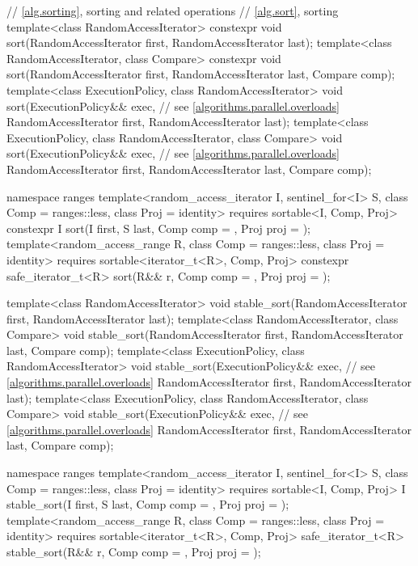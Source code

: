 \begin{codeblock}
{  // \ref{alg.sorting}, sorting and related operations
  // \ref{alg.sort}, sorting
  template<class RandomAccessIterator>
    constexpr void sort(RandomAccessIterator first, RandomAccessIterator last);
  template<class RandomAccessIterator, class Compare>
    constexpr void sort(RandomAccessIterator first, RandomAccessIterator last,
                        Compare comp);
  template<class ExecutionPolicy, class RandomAccessIterator>
    void sort(ExecutionPolicy&& exec,                           // see \ref{algorithms.parallel.overloads}
              RandomAccessIterator first, RandomAccessIterator last);
  template<class ExecutionPolicy, class RandomAccessIterator, class Compare>
    void sort(ExecutionPolicy&& exec,                           // see \ref{algorithms.parallel.overloads}
              RandomAccessIterator first, RandomAccessIterator last,
              Compare comp);

  namespace ranges {
    template<random_access_iterator I, sentinel_for<I> S, class Comp = ranges::less,
             class Proj = identity>
      requires sortable<I, Comp, Proj>
      constexpr I
        sort(I first, S last, Comp comp = {}, Proj proj = {});
    template<random_access_range R, class Comp = ranges::less, class Proj = identity>
      requires sortable<iterator_t<R>, Comp, Proj>
      constexpr safe_iterator_t<R>
        sort(R&& r, Comp comp = {}, Proj proj = {});
  }

  template<class RandomAccessIterator>
    void stable_sort(RandomAccessIterator first, RandomAccessIterator last);
  template<class RandomAccessIterator, class Compare>
    void stable_sort(RandomAccessIterator first, RandomAccessIterator last,
                     Compare comp);
  template<class ExecutionPolicy, class RandomAccessIterator>
    void stable_sort(ExecutionPolicy&& exec,                    // see \ref{algorithms.parallel.overloads}
                     RandomAccessIterator first, RandomAccessIterator last);
  template<class ExecutionPolicy, class RandomAccessIterator, class Compare>
    void stable_sort(ExecutionPolicy&& exec,                    // see \ref{algorithms.parallel.overloads}
                     RandomAccessIterator first, RandomAccessIterator last,
                     Compare comp);

  namespace ranges {
    template<random_access_iterator I, sentinel_for<I> S, class Comp = ranges::less,
             class Proj = identity>
      requires sortable<I, Comp, Proj>
      I stable_sort(I first, S last, Comp comp = {}, Proj proj = {});
    template<random_access_range R, class Comp = ranges::less, class Proj = identity>
      requires sortable<iterator_t<R>, Comp, Proj>
      safe_iterator_t<R>
        stable_sort(R&& r, Comp comp = {}, Proj proj = {});
  }

}
\end{codeblock}

